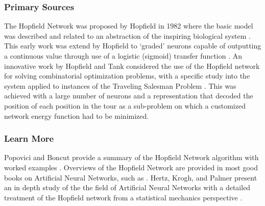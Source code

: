 % 
% 
\subsubsection{Primary Sources}
The Hopfield Network was proposed by Hopfield in 1982 where the basic model was described and related to an abstraction of the inspiring biological system \cite{Hopfield1982}.
This early work was extend by Hopfield to `graded' neurons capable of outputting a continuous value through use of a logistic (sigmoid) transfer function \cite{Hopfield1984}.
An innovative work by Hopfield and Tank considered the use of the Hopfield network for solving combinatorial optimization problems, with a specific study into the system applied to instances of the Traveling Salesman Problem \cite{Hopfield1985}. This was achieved with a large number of neurons and a representation that decoded the position of each position in the tour as a sub-problem on which a customized network energy function had to be minimized.

% 
% 
\subsubsection{Learn More}
Popovici and Boncut provide a summary of the Hopfield Network algorithm with worked examples \cite{Popovici2005}.
Overviews of the Hopfield Network are provided in most good books on Artificial Neural Networks, such as \cite{Rojas1996}.
Hertz, Krogh, and Palmer present an in depth study of the the field of Artificial Neural Networks with a detailed treatment of the Hopfield network from a statistical mechanics perspective \cite{Hertz1991}.



